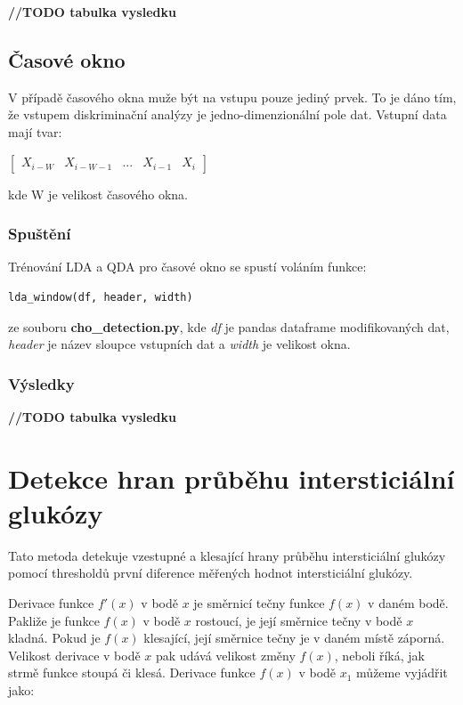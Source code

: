 \textbf{//TODO tabulka vysledku}

\subsection{Časové okno}

V případě časového okna muže být na vstupu pouze jediný prvek. To je dáno tím, že vstupem diskriminační analýzy je jedno-dimenzionální pole dat. Vstupní data mají tvar:

$\begin{bmatrix}
X_{i-W} & X_{i-W-1} & ... & X_{i-1} & X_{i}
\end{bmatrix}$

\noindent kde W je velikost časového okna.

\subsubsection{Spuštění}

Trénování LDA a QDA pro časové okno se spustí voláním funkce:
\begin{verbatim}
lda_window(df, header, width)
\end{verbatim}
ze souboru \textbf{cho\_detection.py}, kde \textit{df} je pandas dataframe modifikovaných dat, \textit{header} je název sloupce vstupních dat a \textit{width} je velikost okna.

\subsubsection{Výsledky}

\textbf{//TODO tabulka vysledku}


\section{Detekce hran průběhu intersticiální glukózy}
\label{ch:threshold}

Tato metoda detekuje vzestupné a klesající hrany průběhu intersticiální glukózy pomocí thresholdů první diference měřených hodnot intersticiální glukózy.

Derivace funkce $f'(x)$ v bodě $x$ je směrnicí tečny funkce $f(x)$ v daném bodě. Pakliže je funkce $f(x)$ v bodě $x$ rostoucí, je její směrnice tečny v bodě $x$ kladná. Pokud je $f(x)$ klesající, její směrnice tečny je v daném místě záporná. Velikost derivace v bodě $x$ pak udává velikost změny $f(x)$, neboli říká, jak strmě funkce stoupá či klesá. Derivace funkce $f(x)$ v bodě $x_{1}$ můžeme vyjádřit jako:

